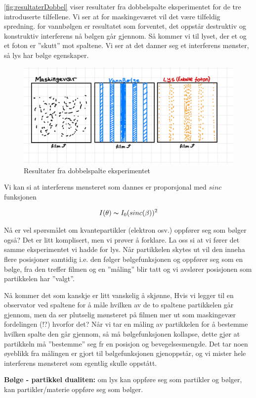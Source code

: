 \autoref{fig:resultaterDobbel} viser resultater fra dobbelspalte eksperimentet for de tre introduserte tilfellene. Vi ser at for maskingeværet vil det være tilfeldig spredning. for vannbølgen er resultatet som forventet, det oppstår destruktiv og konstruktiv interferens nå bølgen går gjennom. Så kommer vi til lyset, der et og et foton er ''skutt'' mot spaltene. Vi ser at det danner seg et interferens mønster, så lys har bølge egenskaper.

\begin{figure}[!htb]
    \centering
    \includegraphics[scale=0.22]{Bilder/SamtaleTema1/ResultaterDobbelspalte.jpeg}
    \caption{Resultater fra dobbelspalte eksperimentet}
    \label{fig:resultaterDobbel}
\end{figure}

Vi kan si at interferens mønsteret som dannes er proporsjonal med $sinc$ funksjonen

\begin{equation}
    \label{eq:intensity}
    I(\theta) \thicksim I_0 (sinc(\beta))^2
\end{equation}

Nå er vel spørsmålet om kvantepartikler (elektron osv.) oppfører seg som bølger også? Det er litt komplisert, men vi prøver å forklare. La oss si at vi fører det samme eksperimentet vi hadde for lys. Når partikkelen skytes ut vil den inneha flere posisjoner samtidig i.e. den følger bølgefunksjonen og oppfører seg som en bølge, fra den treffer filmen og en ''måling'' blir tatt og vi avslører posisjonen som partikkelen har ''valgt''.

Nå kommer det som kanskje er litt vanskelig å skjønne, Hvis vi legger til en observator ved spaltene for å måle hvilken av de to spaltene partikkelen går gjennom, men da ser plutselig mønsteret på filmen mer ut som maskingevær fordelingen (!?) hvorfor det? Når vi tar en måling av partikkelen for å bestemme hvilken spalte den går gjennom, så må bølgefunksjonen kollapse, dette gjør at partikkeln må ''bestemme'' seg fr en posisjon og bevegelsesmengde. Det tar noen øyeblikk fra målingen er gjort til bølgefunksjonen gjenoppstår, og vi mister hele interferens mønsteret som egentlig skulle oppstått.

\begin{definition}
    \textbf{Bølge - partikkel dualiten: }om lys kan oppføre seg som partikler og bølger, kan partikler/materie oppføre seg som bølger.
\end{definition}
